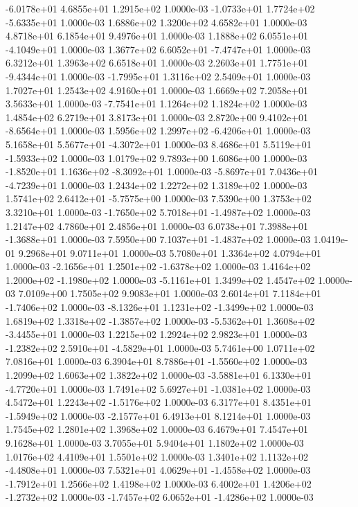 -6.0178e+01  4.6855e+01  1.2915e+02  1.0000e-03
-1.0733e+01  1.7724e+02 -5.6335e+01  1.0000e-03
1.6886e+02 1.3200e+02 4.6582e+01  1.0000e-03
4.8718e+01 6.1854e+01 9.4976e+01  1.0000e-03
 1.1888e+02  6.0551e+01 -4.1049e+01  1.0000e-03
 1.3677e+02  6.6052e+01 -7.4747e+01  1.0000e-03
6.3212e+01 1.3963e+02 6.6518e+01  1.0000e-03
 2.2603e+01  1.7751e+01 -9.4344e+01  1.0000e-03
-1.7995e+01  1.3116e+02  2.5409e+01  1.0000e-03
1.7027e+01 1.2543e+02 4.9160e+01  1.0000e-03
1.6669e+02 7.2058e+01 3.5633e+01  1.0000e-03
-7.7541e+01  1.1264e+02  1.1824e+02  1.0000e-03
1.4854e+02 6.2719e+01 3.8173e+01  1.0000e-03
 2.8720e+00  9.4102e+01 -8.6564e+01  1.0000e-03
 1.5956e+02  1.2997e+02 -6.4206e+01  1.0000e-03
 5.1658e+01  5.5677e+01 -4.3072e+01  1.0000e-03
 8.4686e+01  5.5119e+01 -1.5933e+02  1.0000e-03
1.0179e+02 9.7893e+00 1.6086e+00  1.0000e-03
-1.8520e+01  1.1636e+02 -8.3092e+01  1.0000e-03
-5.8697e+01  7.0436e+01 -4.7239e+01  1.0000e-03
1.2434e+02 1.2272e+02 1.3189e+02  1.0000e-03
 1.5741e+02  2.6412e+01 -5.7575e+00  1.0000e-03
7.5390e+00 1.3753e+02 3.3210e+01  1.0000e-03
-1.7650e+02  5.7018e+01 -1.4987e+02  1.0000e-03
1.2147e+02 4.7860e+01 2.4856e+01  1.0000e-03
 6.0738e+01  7.3988e+01 -1.3688e+01  1.0000e-03
 7.5950e+00  7.1037e+01 -1.4837e+02  1.0000e-03
1.0419e-01 9.2968e+01 9.0711e+01  1.0000e-03
5.7080e+01 1.3364e+02 4.0794e+01  1.0000e-03
-2.1656e+01  1.2501e+02 -1.6378e+02  1.0000e-03
 1.4164e+02  1.2000e+02 -1.1980e+02  1.0000e-03
-5.1161e+01  1.3499e+02  1.4547e+02  1.0000e-03
7.0109e+00 1.7505e+02 9.9083e+01  1.0000e-03
 2.6014e+01  7.1184e+01 -1.7406e+02  1.0000e-03
-8.1326e+01  1.1231e+02 -1.3499e+02  1.0000e-03
 1.6819e+02  1.3318e+02 -1.3857e+02  1.0000e-03
-5.5362e+01  1.3608e+02 -3.4455e+01  1.0000e-03
1.2215e+02 1.2924e+02 2.9823e+01  1.0000e-03
-1.2382e+02  2.5910e+01 -4.5829e+01  1.0000e-03
5.7461e+00 1.0711e+02 7.0816e+01  1.0000e-03
 6.3904e+01  8.7886e+01 -1.5560e+02  1.0000e-03
1.2099e+02 1.6063e+02 1.3822e+02  1.0000e-03
-3.5881e+01  6.1330e+01 -4.7720e+01  1.0000e-03
 1.7491e+02  5.6927e+01 -1.0381e+02  1.0000e-03
 4.5472e+01  1.2243e+02 -1.5176e+02  1.0000e-03
 6.3177e+01  8.4351e+01 -1.5949e+02  1.0000e-03
-2.1577e+01  6.4913e+01  8.1214e+01  1.0000e-03
1.7545e+02 1.2801e+02 1.3968e+02  1.0000e-03
6.4679e+01 7.4547e+01 9.1628e+01  1.0000e-03
3.7055e+01 5.9404e+01 1.1802e+02  1.0000e-03
1.0176e+02 4.4109e+01 1.5501e+02  1.0000e-03
 1.3401e+02  1.1132e+02 -4.4808e+01  1.0000e-03
 7.5321e+01  4.0629e+01 -1.4558e+02  1.0000e-03
-1.7912e+01  1.2566e+02  1.4198e+02  1.0000e-03
 6.4002e+01  1.4206e+02 -1.2732e+02  1.0000e-03
-1.7457e+02  6.0652e+01 -1.4286e+02  1.0000e-03
